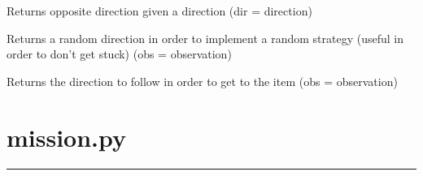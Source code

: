 \documentclass[letterpaper,10pt,english]{sphinxmanual}
\begin{document}

\begin{fulllineitems}
\label{\detokenize{index:heuristics.opposite_direction}}
Returns opposite direction given a direction (dir = direction)

\end{fulllineitems}


\begin{fulllineitems}
\label{\detokenize{index:heuristics.random_direction}}
Returns a random direction in order to implement a random strategy (useful in order to don’t get stuck)
(obs = observation)

\end{fulllineitems}


\begin{fulllineitems}
\label{\detokenize{index:heuristics.towards_item}}
Returns the direction to follow in order to get to the item
(obs = observation)

\end{fulllineitems}

\label{\detokenize{index:module-mission}}

\chapter{mission.py}
\label{\detokenize{index:mission-py}}

\bigskip\hrule\bigskip

\end{document}
